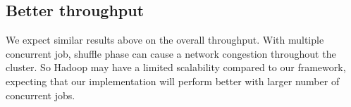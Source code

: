 \documentclass[11pt,a4paper]{article}
\begin{document}
\begin{multicols}{2}
\subsection*{Better throughput}
We expect similar results above on the overall throughput. With multiple concurrent job, shuffle
phase can cause a network congestion throughout the cluster. So Hadoop may have a limited scalability
compared to our framework, expecting that our implementation will perform better with larger
number of concurrent jobs.

\nocite{*} 
{}


\end{multicols}
\end{document}

